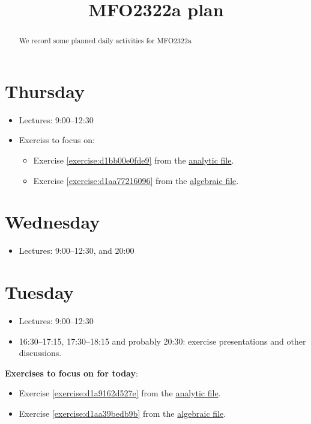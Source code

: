 \documentclass[reqno]{amsart} 
\title{MFO2322a plan}
\begin{document}
\begin{abstract}
  We record some planned daily activities for MFO2322a
\end{abstract}

\section{Thursday}
\begin{itemize}
\item Lectures: 9:00--12:30
\item Exerciss to focus on:
\begin{itemize}
\item Exercise \ref{exercise:d1bb00e0fde9} from the \href{20230524T094424__exercises-localized-vectors.pdf}{analytic file}.
\item Exercise \ref{exercise:d1aa77216096} from the \href{20230528T213149__microlocal-algebraic-exercises.pdf}{algebraic file}.
\end{itemize}
\end{itemize}


\section{Wednesday}
\begin{itemize}
\item Lectures: 9:00--12:30, and 20:00
\end{itemize}


\section{Tuesday}
\begin{itemize}
\item Lectures: 9:00--12:30
\item 16:30--17:15, 17:30--18:15 and probably 20:30: exercise presentations and other discussions.
\end{itemize}
\textbf{Exercises to focus on for today}:
\begin{itemize}
\item Exercise \ref{exercise:d1a9162d527e} from the \href{20230524T094424__exercises-localized-vectors.pdf}{analytic file}.
\item Exercise \ref{exercise:d1aa39bedb9b} from the \href{20230528T213149__microlocal-algebraic-exercises.pdf}{algebraic file}.
\end{itemize}
\end{document}
